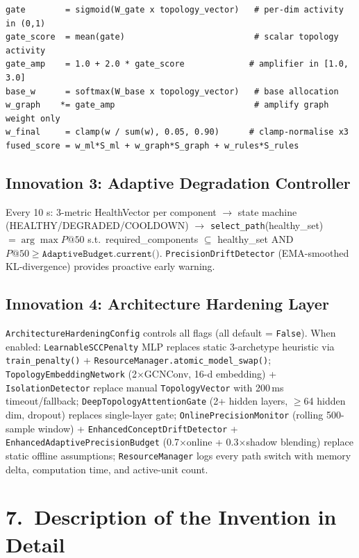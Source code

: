 \documentclass[12pt,a4paper]{article}
\begin{document}
\begin{lstlisting}
gate        = sigmoid(W_gate x topology_vector)   # per-dim activity in (0,1)
gate_score  = mean(gate)                          # scalar topology activity
gate_amp    = 1.0 + 2.0 * gate_score             # amplifier in [1.0, 3.0]
base_w      = softmax(W_base x topology_vector)   # base allocation
w_graph    *= gate_amp                            # amplify graph weight only
w_final     = clamp(w / sum(w), 0.05, 0.90)      # clamp-normalise x3
fused_score = w_ml*S_ml + w_graph*S_graph + w_rules*S_rules
\end{lstlisting}

\subsection{Innovation 3: Adaptive Degradation Controller}

Every 10 s: 3-metric HealthVector per component $\to$ state machine (HEALTHY/DEGRADED/COOLDOWN)
$\to$ \texttt{select\_path}(healthy\_set) $= \arg\max P@50$ s.t.\ required\_components $\subseteq$
healthy\_set AND $P@50 \geq \texttt{AdaptiveBudget.current()}$.
\texttt{PrecisionDriftDetector} (EMA-smoothed KL-divergence) provides proactive early warning.

\subsection{Innovation 4: Architecture Hardening Layer}

\texttt{ArchitectureHardeningConfig} controls all flags (all default = \texttt{False}).
When enabled: \texttt{LearnableSCCPenalty} MLP replaces static 3-archetype heuristic via
\texttt{train\_penalty()} + \texttt{ResourceManager.atomic\_model\_swap()};
\texttt{TopologyEmbeddingNetwork} (2$\times$GCNConv, 16-d embedding) + \texttt{IsolationDetector}
replace manual \texttt{TopologyVector} with 200\,ms timeout/fallback;
\texttt{DeepTopologyAttentionGate} (2+ hidden layers, $\geq$64 hidden dim, dropout) replaces single-layer gate;
\texttt{OnlinePrecisionMonitor} (rolling 500-sample window) + \texttt{EnhancedConceptDriftDetector}
+ \texttt{EnhancedAdaptivePrecisionBudget} (0.7$\times$online + 0.3$\times$shadow blending) replace
static offline assumptions; \texttt{ResourceManager} logs every path switch with memory delta,
computation time, and active-unit count.

\section{7.\ Description of the Invention in Detail}
\end{document}
